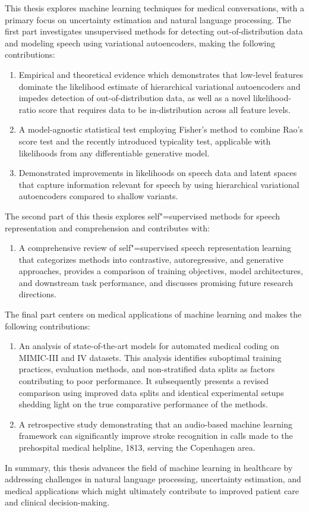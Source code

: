 This thesis explores machine learning techniques for medical conversations, with a primary focus on uncertainty estimation and natural language processing. The first part investigates unsupervised methods for detecting out-of-distribution data and modeling speech using variational autoencoders, making the following contributions:
%
\begin{enumerate}[label=(\roman*)] 
    \item Empirical and theoretical evidence which demonstrates that low-level features dominate the likelihood estimate of hierarchical variational autoencoders and impedes detection of out-of-distribution data, as well as a novel likelihood-ratio score that requires data to be in-distribution across all feature levels.
    \item A model-agnostic statistical test employing Fisher's method to combine Rao's score test and the recently introduced typicality test, applicable with likelihoods from any differentiable generative model.
    \item Demonstrated improvements in likelihoods on speech data and latent spaces that capture information relevant for speech by using hierarchical variational autoencoders compared to shallow variants.
\end{enumerate}
%
The second part of this thesis explores self"=supervised methods for speech representation and comprehension and contributes with:
%
\begin{enumerate}[resume, label=(\roman*)] 
    \item A comprehensive review of self"=supervised speech representation learning that categorizes methods into contrastive, autoregressive, and generative approaches, provides a comparison of training objectives, model architectures, and downstream task performance, and discusses promising future research directions.
\end{enumerate}
%
The final part centers on medical applications of machine learning and makes the following contributions:
%
\begin{enumerate}[resume, label=(\roman*)] 
    \item An analysis of state-of-the-art models for automated medical coding on MIMIC-III and IV datasets. This analysis identifies suboptimal training practices, evaluation methods, and non-stratified data splits as factors contributing to poor performance. It subsequently presents a revised comparison using improved data splits and identical experimental setups shedding light on the true comparative performance of the methods.
    \item A retrospective study demonstrating that an audio-based machine learning framework can significantly improve stroke recognition in calls made to the prehospital medical helpline, 1813, serving the Copenhagen area.
\end{enumerate}
%
In summary, this thesis advances the field of machine learning in healthcare by addressing challenges in natural language processing, uncertainty estimation, and medical applications which might ultimately contribute to improved patient care and clinical decision-making.
